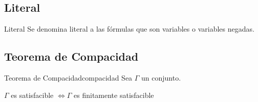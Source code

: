 \subsection{Literal}

\begin{definicion}{Literal}{}
    Se denomina literal a las fórmulas que son variables o variables negadas.
\end{definicion}


\subsection{Teorema de Compacidad}

\begin{teorema}{Teorema de Compacidad}{compacidad}
    Sea $\Gamma$ un conjunto.

    \medskip

    \begin{center}
        $\Gamma$ es satisfacible $\iff \Gamma$ es finitamente satisfacible
    \end{center}
\end{teorema}


